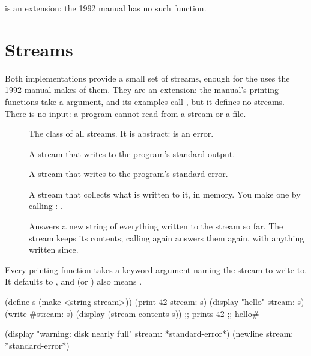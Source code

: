 \noindent
{} is an extension: the 1992 manual has no such
function.

\section{Streams}\label{sec:printing-streams}

Both implementations provide a small set of streams, enough for the uses
the 1992 manual makes of them. They are an extension: the manual's
printing functions take a  argument, and its examples call
, but it defines no streams. There is no input: a program
cannot read from a stream or a file.

\begin{description}
\item[] The class of all
  streams. It is abstract:  is an error.
\item[]
  A stream that writes to the program's standard output.
\item[]
  A stream that writes to the program's standard error.
\item[]
  A stream that collects what is written to it, in memory. You make
  one by calling : .
\item[]
  Answers a new string of everything written to the stream so far. The
  stream keeps its contents; calling  again answers
  them again, with anything written since.
\end{description}

\noindent
Every printing function takes a  keyword argument naming
the stream to write to. It defaults to , and
 (or ) also means .

\begin{dylan}
(define s (make <string-stream>))
(print 42 stream: s)
(display "hello" stream: s)
(write #\x stream: s)
(display (stream-contents s))
;; prints  42
;;         hello#\x

(display "warning: disk nearly full" stream: *standard-error*)
(newline stream: *standard-error*)
\end{dylan}

